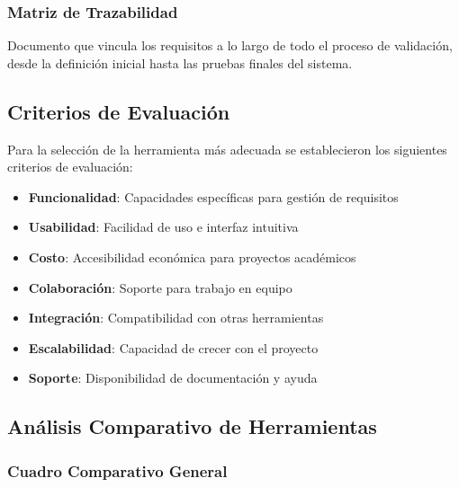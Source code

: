 \documentclass[12pt,a4paper]{article}
\begin{document}
\subsubsection{Matriz de Trazabilidad}
Documento que vincula los requisitos a lo largo de todo el proceso de validación, desde la definición inicial hasta las pruebas finales del sistema.

\subsection{Criterios de Evaluación}

Para la selección de la herramienta más adecuada se establecieron los siguientes criterios de evaluación:

\begin{itemize}
    \item \textbf{Funcionalidad}: Capacidades específicas para gestión de requisitos
    \item \textbf{Usabilidad}: Facilidad de uso e interfaz intuitiva
    \item \textbf{Costo}: Accesibilidad económica para proyectos académicos
    \item \textbf{Colaboración}: Soporte para trabajo en equipo
    \item \textbf{Integración}: Compatibilidad con otras herramientas
    \item \textbf{Escalabilidad}: Capacidad de crecer con el proyecto
    \item \textbf{Soporte}: Disponibilidad de documentación y ayuda
\end{itemize}

\newpage

\subsection{Análisis Comparativo de Herramientas}

\subsubsection{Cuadro Comparativo General}
\end{document}
